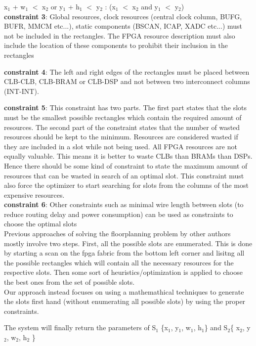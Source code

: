\documentclass[11pt]{article}
\theoremstyle{definition}
\begin{document}
\hspace{15mm}  x$_1$ + w$_1$ $<$ x$_2$ or y$_1$ + h$_1$ $<$ y$_2$ : (x$_1$ $<$ x$_2$ and y$_1$ $<$ y$_2$) \\

\textbf{constraint 3}: Global resources, clock resources (central clock column, BUFG, BUFR, MMCM etc...), static components (BSCAN, ICAP, XADC etc...) must not be included in the rectangles. The FPGA resource description must also include the location of these components to prohibit their inclusion in the rectangles

\textbf{constraint 4}: The left and right edges of the rectangles must be placed between CLB-CLB, CLB-BRAM or CLB-DSP and not between two interconnect columns (INT-INT).

\textbf{constraint 5}: This constraint has two parts. The first part states that the slots must be the smallest possible rectangles which contain the required amount of resources. The second part of the constraint states that the number of wasted resources should be kept to the minimum. Resources are considered wasted if they are included in a slot while not being used. All FPGA resources are not equally valuable. This means it is better to waste CLBs than BRAMs than DSPs. Hence there should be some kind of constraint to state the maximum amount of resources that can be wasted in search of an optimal slot. This constraint must also force the optimizer to start searching for slots from the columns of the most expensive resources. \\

\textbf{constraint 6}: Other constraints such as minimal wire length between slots (to reduce routing delay and power consumption) can be used as constraints to choose the optimal slots \\
 
Previous approaches of solving the floorplanning problem by other authors mostly involve two steps. First, all the possible slots are enumerated. This is done by starting a scan on the fpga fabric from the bottom left corner and lisitng all the possible rectangles which will contain all the necessary resources for the respective slots. Then some sort of heuristics/optimization is applied to choose the best ones from the set of possible slots.\\
Our approach instead focuses on using a mathemathical techniques to generate the slots first hand (without enumerating all possible slots) by using the proper constraints. 


The system will finally return the parameters of S$_1$ \{x$_1$, y$_1$, w$_1$, h$_1$\} and S$_2$\{ x$_2$, y$_2$, w$_2$, h$_2$ \} \\
\end{document}
